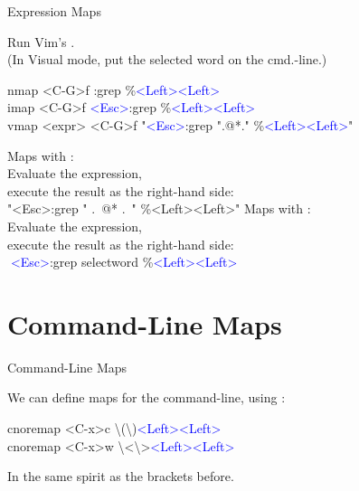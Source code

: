 \documentclass{beamer}
\newenvironment{mycode}[0]
{\ttfamily}
{}
\newcommand{\myind}[1]{\textcolor{white}{#1}}
\newcommand{\mystring}[1]{\textcolor{string}{#1}}
\newcommand{\myctrlkey}[1]{\textcolor{blue}{#1}}
\begin{document}
\begin{frame}{Expression Maps}{}

	Run Vim's . \\
	(In Visual mode, put the selected word on the cmd.-line.) \\
	\vspace{2mm}

	\begin{mycode}
		nmap {} {} {} {} {} {} {} <C-G>f {} {} {} {} {} {} :grep {} \%\myctrlkey{<Left><Left>} \\
		imap {} {} {} {} {} {} {} <C-G>f {}           \myctrlkey{<Esc>}:grep {} \%\myctrlkey{<Left><Left>} \\
		vmap <expr>               <C-G>f             "\myctrlkey{<Esc>}:grep ".@*." \%\myctrlkey{<Left><Left>}" \\
	\end{mycode}

	\vspace{5mm}
	\pause[2]

	\begin{overprint}
		Maps with : \\
		Evaluate the expression, \\
		execute the result as the right-hand side: \\[2mm]
		\begin{mycode}
			\mystring{"<Esc>:grep "} .\ @* .\ \mystring{" \%<Left><Left>"}
		\end{mycode}
		\onslide<3>
		Maps with : \\
		Evaluate the expression, \\
		execute the result as the right-hand side: \\[2mm]
		\begin{mycode}
			\myind{.}\myctrlkey{<Esc>}:grep selectword \%\myctrlkey{<Left><Left>}
		\end{mycode}
	\end{overprint}

\end{frame}


\section{Command-Line Maps}

\begin{frame}{Command-Line Maps}{}

	We can define maps for the command-line, using :
	\vspace{2mm}

	\begin{mycode}
		cnoremap  <C-x>c  \textbackslash(\textbackslash)\myctrlkey{<Left><Left>} \\
		cnoremap  <C-x>w  \textbackslash<\textbackslash>\myctrlkey{<Left><Left>}
	\end{mycode}

	\vspace{2mm}
	In the same spirit as the brackets before.

\end{frame}
\end{document}

